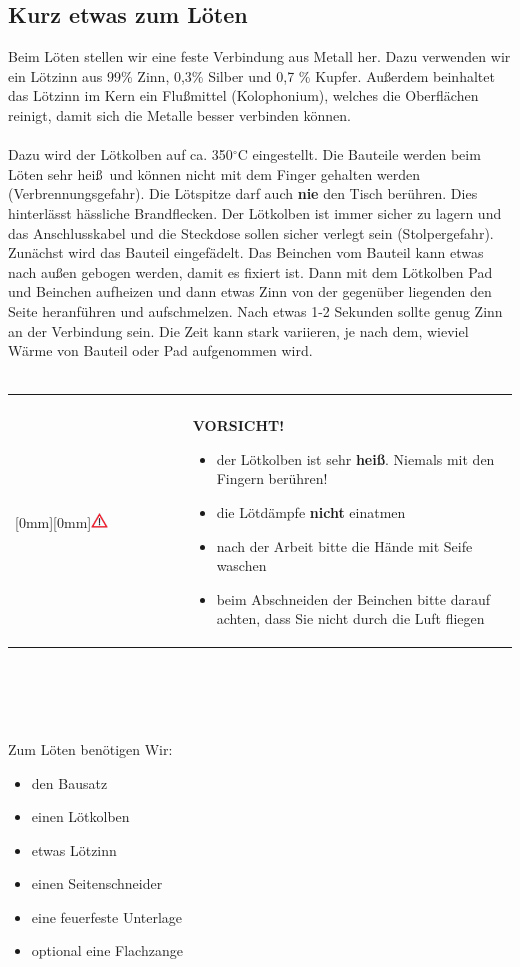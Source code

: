 \documentclass[a4paper]{article}
\newcommand\Vorsicht[1]{%
\ \\
\begin{tabular}{p{0.16\textwidth} p{0.79\textwidth}|}
\cline{2-2}
& \\
 \multirow{5}{*}{\raisebox{0mm}[0mm][0mm]{\includegraphics[width=0.1\textwidth]{../pictures/Vorsicht.png}}} & \textbf{VORSICHT!}{\begin{flushleft}#1\end{flushleft}} \\
\cline{2-2}
\end{tabular}
\ \\
}
\begin{document}
\subsection{Kurz etwas zum Löten}
Beim Löten stellen wir eine feste Verbindung aus Metall her. Dazu verwenden wir ein Lötzinn aus 99\% Zinn, 0,3\% Silber und 0,7 \% Kupfer. Außerdem beinhaltet das Lötzinn im Kern ein Flußmittel (Kolophonium), welches die Oberflächen reinigt, damit sich die Metalle besser verbinden können.\\
\ \\
Dazu wird der Lötkolben auf ca. 350$^{\circ}$C eingestellt. Die Bauteile werden beim Löten sehr hei\ss \ und können nicht mit dem Finger gehalten werden (Verbrennungsgefahr). Die Lötspitze darf auch \textbf{nie} den Tisch berühren. Dies hinterlässt hässliche Brandflecken. Der Lötkolben ist immer sicher zu lagern und das Anschlusskabel und die Steckdose sollen sicher verlegt sein (Stolpergefahr).\\
Zunächst wird das Bauteil eingefädelt. Das Beinchen vom Bauteil kann etwas nach au\ss en gebogen werden, damit es fixiert ist. Dann mit dem Lötkolben Pad und Beinchen aufheizen und dann etwas Zinn von der gegenüber liegenden den Seite heranführen und aufschmelzen. Nach etwas 1-2 Sekunden sollte genug Zinn an der Verbindung sein. Die Zeit kann stark variieren, je nach dem, wieviel Wärme von Bauteil oder Pad aufgenommen wird.\\
\Vorsicht{\begin{itemize} \item der Lötkolben ist sehr \textbf{heiß}. Niemals mit den Fingern berühren!
\item die Lötdämpfe \textbf{nicht} einatmen \item nach der Arbeit bitte die Hände mit Seife waschen\item beim Abschneiden der Beinchen bitte darauf achten, dass Sie nicht durch die Luft fliegen\end{itemize}}\\
\ \\
\ \\
Zum Löten benötigen Wir:
\begin{itemize}
  \item     den Bausatz
  \item     einen Lötkolben
  \item     etwas Lötzinn
  \item     einen Seitenschneider
  \item     eine feuerfeste Unterlage
  \item     optional eine Flachzange
\end{itemize}
\end{document}
